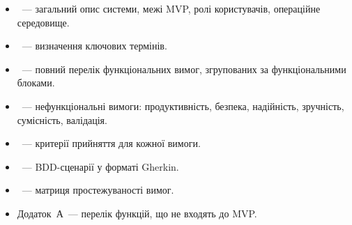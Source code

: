 \begin{itemize}
  \item {}~--- загальний опис системи, межі MVP, ролі користувачів, операційне середовище.
  \item {}~--- визначення ключових термінів.
  \item {}~--- повний перелік функціональних вимог, згрупованих за функціональними блоками.
  \item {}~--- нефункціональні вимоги: продуктивність, безпека, надійність, зручність, сумісність, валідація.
  \item {}~--- критерії прийняття для кожної вимоги.
  \item {}~--- BDD-сценарії у форматі Gherkin.
  \item {}~--- матриця простежуваності вимог.
  \item Додаток~А~--- перелік функцій, що не входять до MVP.
\end{itemize}
